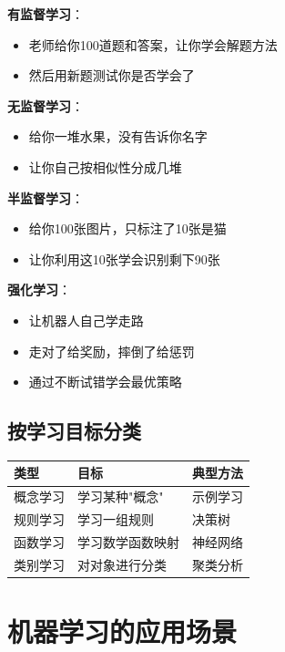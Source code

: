 \begin{examplebox}[例子：四种学习形式的区别]
\textbf{有监督学习}：
\begin{itemize}[itemsep=0pt]
    \item 老师给你100道题和答案，让你学会解题方法
    \item 然后用新题测试你是否学会了
\end{itemize}

\textbf{无监督学习}：
\begin{itemize}[itemsep=0pt]
    \item 给你一堆水果，没有告诉你名字
    \item 让你自己按相似性分成几堆
\end{itemize}

\textbf{半监督学习}：
\begin{itemize}[itemsep=0pt]
    \item 给你100张图片，只标注了10张是猫
    \item 让你利用这10张学会识别剩下90张
\end{itemize}

\textbf{强化学习}：
\begin{itemize}[itemsep=0pt]
    \item 让机器人自己学走路
    \item 走对了给奖励，摔倒了给惩罚
    \item 通过不断试错学会最优策略
\end{itemize}
\end{examplebox}

\subsection{按学习目标分类}

\begin{table}[htbp]
\centering\small
\begin{tabular}{lll}
\toprule
\textbf{类型} & \textbf{目标} & \textbf{典型方法} \\
\midrule
概念学习 & 学习某种"概念" & 示例学习 \\
规则学习 & 学习一组规则 & 决策树 \\
函数学习 & 学习数学函数映射 & 神经网络 \\
类别学习 & 对对象进行分类 & 聚类分析 \\
\bottomrule
\end{tabular}
\end{table}

\section{机器学习的应用场景}

